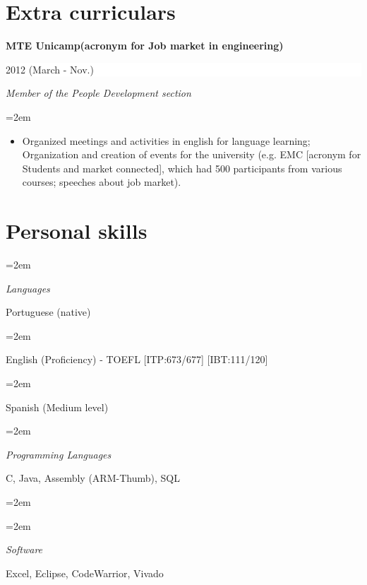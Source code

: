 \documentclass[paper=a4,fontsize=11pt]{scrartcl} %
\newlength{\spacebox}
\newcommand{\NewPart}[1]{\section*{{#1}}}
\newcommand{\PersonalEntry}[2]{
        \noindent\hangindent=2em\hangafter=0 %
        \parbox{\spacebox}{        %
        \textit{#1}}               %
        \hspace{1.5em} #2 \par}    %
\newcommand{\SkillsEntry}[2]{      %
\noindent\hangindent=2em\hangafter=0 %
        \parbox{\spacebox}{        %
        \textit{#1}}               %
        \hspace{1.5em} #2 \par}    %
\newcommand{\EducationEntry}[4]{
        \noindent \textbf{#1} \hfill      %
        \colorbox{White}{%
            \parbox{5cm}{%
            \hfill\color{Black}#2}} \par  %
        \noindent \textit{#3} \par        %
        \noindent\hangindent=2em\hangafter=0 \small #4 %
        \normalsize \par}
\begin{document}
\NewPart{Extra curriculars}{}

\EducationEntry{MTE Unicamp(acronym for Job market in engineering)}{2012 (March - Nov.)}{Member of the People Development section}
{
    \begin{itemize}
        \item{Organized meetings and activities in english for language learning; Organization and creation of events for the university (e.g. EMC [acronym for Students and market connected], which had 500 participants from various courses; speeches about job market).\\}
    \end{itemize}
}

\NewPart{Personal skills}{}
\SkillsEntry{Languages}{Portuguese (native)}
\SkillsEntry{}{English (Proficiency) - TOEFL [ITP:673/677] [IBT:111/120] }
\SkillsEntry{}{Spanish (Medium level)\\}
\SkillsEntry{Programming Languages}{C, Java, Assembly (ARM-Thumb), SQL}
\SkillsEntry{}{}
\SkillsEntry{Software}{Excel, Eclipse, CodeWarrior, Vivado}

\end{document}
